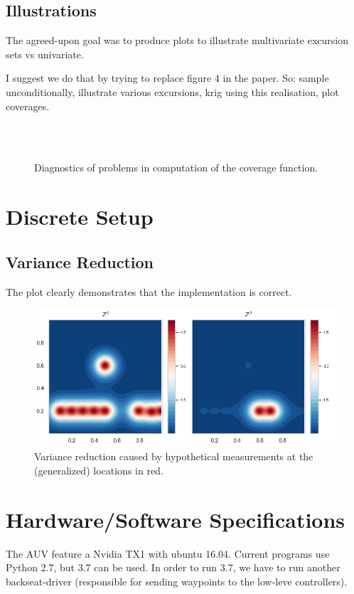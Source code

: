 \documentclass[a4paper,10pt]{article}
\begin{document}
\subsection{Illustrations}
The agreed-upon goal was to produce plots to illustrate multivariate excursion
sets vs univariate.

I suggest we do that by trying to replace figure 4 in the paper.
So: sample unconditionally, illustrate various excursions, krig using this
realisation, plot coverages.

\begin{figure}[tbh!p]
\centering
{}\\
\\
\caption{Diagnostics of problems in computation of the coverage function.}
\label{fig:example_inv_prob}
\end{figure}

\section{Discrete Setup}

\subsection{Variance Reduction}
The plot clearly demonstrates that the implementation is correct.

\begin{figure}[tbh!p]
\centering
	\includegraphics[scale=0.8]{images/variance_reduction.png}
\caption{Variance reduction caused by hypothetical measurements at the (generalized) locations in red.}
\end{figure}

\section{Hardware/Software Specifications}
The AUV feature a Nvidia TX1 with ubuntu 16.04. Current programs use Python
2.7, but 3.7 can be used.
In order to run 3.7, we have to run
another backseat-driver (responsible for sending waypoints to the low-leve
controllers).
\end{document}
